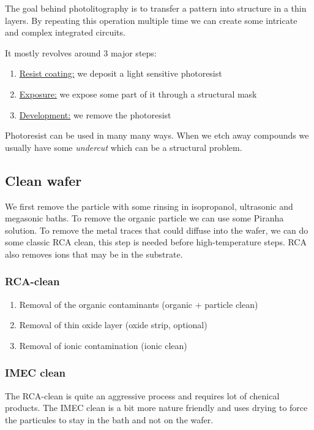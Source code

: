 \documentclass{report}
\begin{document}
The goal behind photolitography is to transfer a pattern into structure in a thin layers. By repeating this operation multiple time we can create some intricate and complex integrated circuits.

It mostly revolves around 3 major steps:

\begin{enumerate}
    \item \underline{Resist coating:} we deposit a light sensitive photoresist
    \item \underline{Exposure:} we expose some part of it through a structural mask
    \item \underline{Development:} we remove the photoresist
\end{enumerate}

Photoresist can be used in many many ways. When we etch away compounds we usually have some \textit{undercut} which can be a structural problem.

\subsection{Clean wafer}

We first remove the particle with some rinsing in isopropanol, ultrasonic and megasonic baths. To remove the organic particle we can use some Piranha solution. To remove the metal traces that could diffuse into the wafer, we can do some classic RCA clean, this step is needed before high-temperature steps. RCA also removes ions that may be in the substrate.

\subsubsection{RCA-clean}

\begin{enumerate}
    \item Removal of the organic contaminants (organic + particle clean)
    \item Removal of thin oxide layer (oxide strip, optional)
    \item Removal of ionic contamination (ionic clean)
\end{enumerate}

\subsubsection{IMEC clean}

The RCA-clean is quite an aggressive process and requires lot of chenical products. The IMEC clean is a bit more nature friendly and uses drying to force the particules to stay in the bath and not on the wafer.
\end{document}
